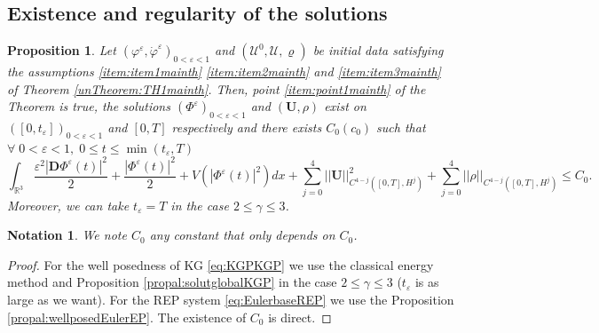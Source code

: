 \documentclass[a4paper, 15pt]{article}
\numberwithin{equation}{section}
\newtheorem{propal}[defi]{Proposition}
\newtheorem{nota}[defi]{Notation}
\begin{document}
\subsection{Existence and regularity of the solutions}
\label{subsection:reguexist}
\begin{propal}
\label{propal:reguexistProof}
Let $(\varphi^\varepsilon,\dot{\varphi}^\varepsilon)_{0<\varepsilon<1}$ and $(\mathscr{U}^0,\mathscr{U},\varrho)$ be initial data satisfying the assumptions \ref{item:item1mainth} \ref{item:item2mainth} and \ref{item:item3mainth}  of Theorem \ref{unTheorem:TH1mainth}. Then, point \ref{item:point1mainth} of the Theorem is true, the solutions $(\Phi^\varepsilon)_{0<\varepsilon<1}$ and $(\textbf{U},\rho)$ exist on $([0,t_\varepsilon])_{0<\varepsilon<1}$ and $[0,T]$ respectively and there exists $C_0(c_0)$ such that $\forall\;0<\varepsilon<1,\; 0\leq t\leq \min(t_\varepsilon,T)$
     \begin{equation}
     \label{eq:Coenergmainth}
         \int_{\mathbb{R}^3}{\frac{\varepsilon^2|\textbf{D}\Phi^\varepsilon(t)|^2}{2}+\frac{|\Phi^\varepsilon(t)|^2}{2}+V(|\Phi^\varepsilon(t)|^2)dx}+\sum_{j=0}^4||\textbf{U}||_{C^{4-j}([0,T],H^j)}^2+\sum_{j=0}^4||\rho||_{C^{4-j}([0,T],H^j)}\leq C_0.
     \end{equation}
Moreover, we can take $t_\varepsilon=T$ in the case $2\leq\gamma\leq3$.\\
\end{propal}
\begin{nota}
\label{nota:ColaconstantProof}
We note $C_0$ any constant that only depends on $C_0$.
\end{nota}
\begin{proof}
For the well posedness of KG \eqref{eq:KGPKGP} we use the classical energy method and Proposition \ref{propal:solutglobalKGP} in the case $2\leq\gamma\leq3$ ($t_\varepsilon$ is as large as we want). For the REP system \eqref{eq:EulerbaseREP} we use the Proposition \ref{propal:wellposedEulerEP}. The existence of $C_0$ is direct.  
\end{proof}
\end{document}
